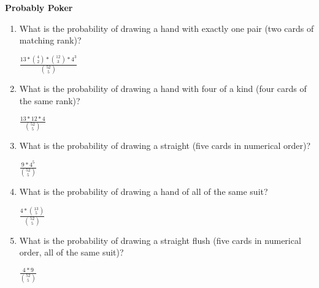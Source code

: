 \question \textbf{Probably Poker}
\begin{enumerate}[label=(\alph*)]
\item What is the probability of drawing a hand with exactly one pair (two cards of matching rank)?
\begin{solution}[2cm]
$ \frac{13 * {4 \choose 2} * {12 \choose 3} * 4^3}{{52 \choose 5}}$ 
\end{solution}
 
\item What is the probability of drawing a hand with four of a kind (four cards of the same rank)?
\begin{solution}[2cm]
$\frac{ 13 * 12 * 4}{{52 \choose 5}}$
 \end{solution}
 
\item What is the probability of drawing a straight (five cards in numerical order)? 
\begin{solution}[2cm]
$\frac{ 9 * 4^5}{{52 \choose 5}}$
 \end{solution}
 
\item What is the probability of drawing a hand of all of the same suit? 
\begin{solution}[2cm]
$\frac{4 * {13 \choose 5}}{{52 \choose 5}}$
 \end{solution}
 
\item What is the probability of drawing a straight flush (five cards in numerical order, all of the same suit)? 
\begin{solution}[2cm]
$\frac{4 * 9}{{52 \choose 5}}$
 \end{solution}
\end{enumerate}